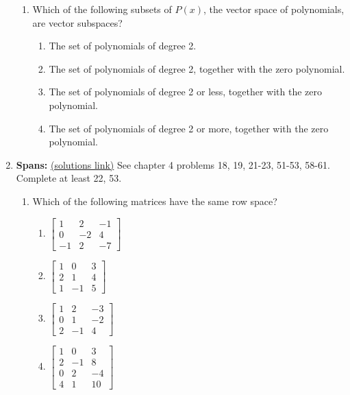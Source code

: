 \begin{enumerate}
\begin{enumerate}
	\item Which of the following subsets of $P(x)$, the vector space of polynomials, are vector subspaces?
		\begin{enumerate}
			\item The set of polynomials of degree 2.
			\item The set of polynomials of degree 2, together with the zero polynomial.
			\item The set of polynomials of degree 2 or less, together with the zero polynomial.
			\item The set of polynomials of degree 2 or more, together with the zero polynomial.
		\end{enumerate}

\end{enumerate}


\item \textbf{Spans:} \label{span problems} \hypertarget{span problems target}{\hyperlink{span solutions target}{(solutions link)}}
See chapter 4 problems 18, 19, 21-23, 51-53, 58-61. 
Complete at least 22, 53.

\begin{enumerate}
	\item Which of the following matrices have the same row space?
\begin{multicols}{4}
\begin{enumerate}
\item 
$\begin{bmatrix}
 1 & 2 & -1 \\
 0 & -2 & 4 \\
 -1 & 2 & -7
\end{bmatrix}$

\item 
$\begin{bmatrix}
 1 & 0 & 3 \\
 2 & 1 & 4 \\
 1 & -1 & 5
\end{bmatrix}$

\item 
$\begin{bmatrix}
 1 & 2 & -3 \\
 0 & 1 & -2 \\
 2 & -1 & 4
\end{bmatrix}$

\item 
$\begin{bmatrix}
 1 & 0 & 3 \\
 2 & -1 & 8 \\
 0 & 2 & -4 \\
 4 & 1 & 10
\end{bmatrix}$


\end{enumerate}
\end{multicols}
\end{enumerate}
\end{enumerate}
